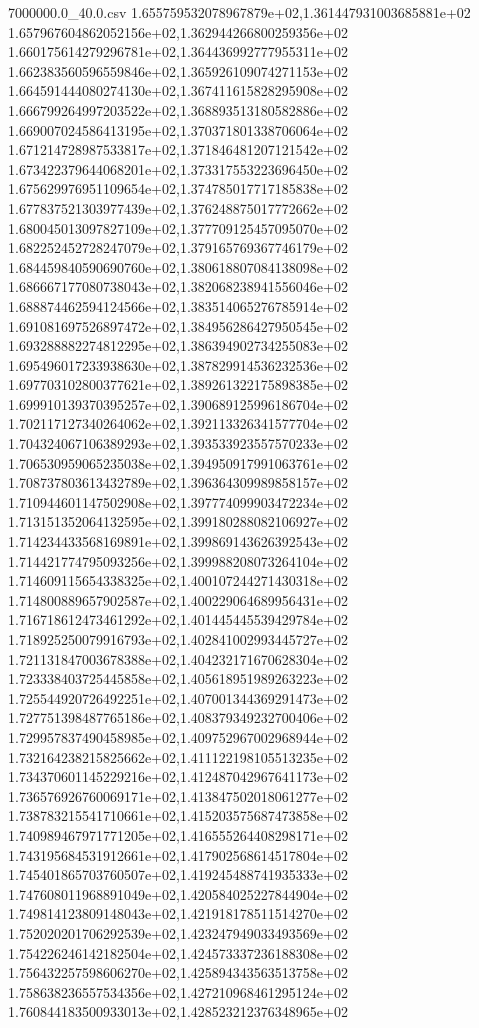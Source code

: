 \begin{filecontents*}{7000000.0_40.0.csv}
1.655759532078967879e+02,1.361447931003685881e+02
1.657967604862052156e+02,1.362944266800259356e+02
1.660175614279296781e+02,1.364436992777955311e+02
1.662383560596559846e+02,1.365926109074271153e+02
1.664591444080274130e+02,1.367411615828295908e+02
1.666799264997203522e+02,1.368893513180582886e+02
1.669007024586413195e+02,1.370371801338706064e+02
1.671214728987533817e+02,1.371846481207121542e+02
1.673422379644068201e+02,1.373317553223696450e+02
1.675629976951109654e+02,1.374785017717185838e+02
1.677837521303977439e+02,1.376248875017772662e+02
1.680045013097827109e+02,1.377709125457095070e+02
1.682252452728247079e+02,1.379165769367746179e+02
1.684459840590690760e+02,1.380618807084138098e+02
1.686667177080738043e+02,1.382068238941556046e+02
1.688874462594124566e+02,1.383514065276785914e+02
1.691081697526897472e+02,1.384956286427950545e+02
1.693288882274812295e+02,1.386394902734255083e+02
1.695496017233938630e+02,1.387829914536232536e+02
1.697703102800377621e+02,1.389261322175898385e+02
1.699910139370395257e+02,1.390689125996186704e+02
1.702117127340264062e+02,1.392113326341577704e+02
1.704324067106389293e+02,1.393533923557570233e+02
1.706530959065235038e+02,1.394950917991063761e+02
1.708737803613432789e+02,1.396364309989858157e+02
1.710944601147502908e+02,1.397774099903472234e+02
1.713151352064132595e+02,1.399180288082106927e+02
1.714234433568169891e+02,1.399869143626392543e+02
1.714421774795093256e+02,1.399988208073264104e+02
1.714609115654338325e+02,1.400107244271430318e+02
1.714800889657902587e+02,1.400229064689956431e+02
1.716718612473461292e+02,1.401445445539429784e+02
1.718925250079916793e+02,1.402841002993445727e+02
1.721131847003678388e+02,1.404232171670628304e+02
1.723338403725445858e+02,1.405618951989263223e+02
1.725544920726492251e+02,1.407001344369291473e+02
1.727751398487765186e+02,1.408379349232700406e+02
1.729957837490458985e+02,1.409752967002968944e+02
1.732164238215825662e+02,1.411122198105513235e+02
1.734370601145229216e+02,1.412487042967641173e+02
1.736576926760069171e+02,1.413847502018061277e+02
1.738783215541710661e+02,1.415203575687473858e+02
1.740989467971771205e+02,1.416555264408298171e+02
1.743195684531912661e+02,1.417902568614517804e+02
1.745401865703760507e+02,1.419245488741935333e+02
1.747608011968891049e+02,1.420584025227844904e+02
1.749814123809148043e+02,1.421918178511514270e+02
1.752020201706292539e+02,1.423247949033493569e+02
1.754226246142182504e+02,1.424573337236188308e+02
1.756432257598606270e+02,1.425894343563513758e+02
1.758638236557534356e+02,1.427210968461295124e+02
1.760844183500933013e+02,1.428523212376348965e+02

\end{filecontents*}
